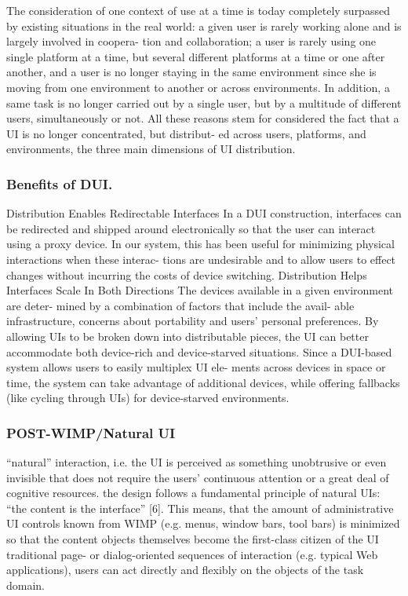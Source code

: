\cite{vanderdonckt2010distributed}The consideration of one context of use at a
time is today completely surpassed by existing situations in the real world: a
given user is rarely working alone and is largely involved in coopera- tion and
collaboration; a user is rarely using one single platform at a time, but several different platforms at a time or one after another, and a user is no longer staying in the same environment since she is moving from one environment to another or across environments. In addition, a same task is no longer carried out by a single user, but by a multitude of different users, simultaneously or not. All these reasons stem for considered the fact that a UI is no longer concentrated, but distribut- ed across users, platforms, and environments, the three main dimensions of UI distribution.\\

\subsubsection{Benefits of DUI.} \cite{chen2011distributed}
Distribution Enables Redirectable Interfaces
In a DUI construction, interfaces can be redirected and shipped around electronically so that the user can interact using a proxy device. In our system, this has been useful for minimizing physical interactions when these interac- tions are undesirable and to allow users to effect changes without incurring the costs of device switching.
Distribution Helps Interfaces Scale In Both Directions
The devices available in a given environment are deter- mined by a combination
of factors that include the avail- able infrastructure, concerns about
portability and users' personal preferences. By allowing UIs to be broken down into distributable pieces, the UI can better accommodate both device-rich and device-starved situations. Since a DUI-based system allows users to easily multiplex UI ele- ments across devices in space or time, the system can take advantage of additional devices, while offering fallbacks (like cycling through UIs) for device-starved environments.\\

\subsubsection{POST-WIMP/Natural UI}
\cite{seifried2011lessons} “natural” interaction, i.e. the UI is perceived as
something unobtrusive or even invisible that does not require the users’
continuous attention or a great deal of cognitive resources. the design follows
a fundamental principle of natural UIs: “the content is the interface” [6]. This means, that the amount of administrative UI controls known
from WIMP (e.g. menus, window bars, tool bars) is minimized so that the content
objects themselves become the first-class citizen of the UI\ldotsabandoning
traditional page- or dialog-oriented sequences of interaction (e.g. typical Web
applications), users can act directly and flexibly on the objects of the task
domain.\\


